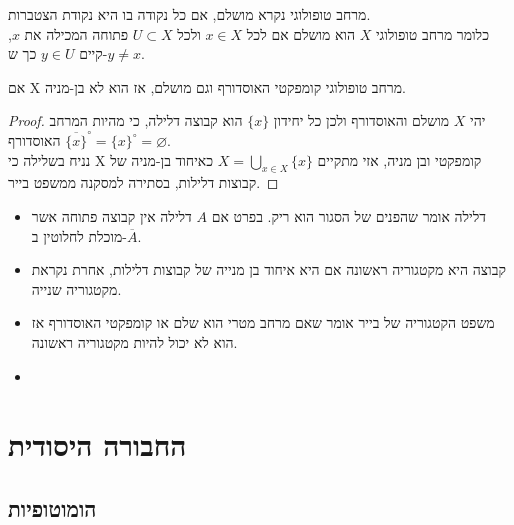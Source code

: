 \documentclass{tstextbook}
\begin{document}
\begin{definition}
מרחב טופולוגי נקרא מושלם, אם כל נקודה בו היא נקודת הצטברות.\\

כלומר מרחב טופולוגי \(X\) הוא מושלם אם לכל \(x\in X\) ולכל \(U\subset X\) פתוחה המכילה את \(x\), קיים \(y\in U\) כך ש-\(y\ne x\).  

\end{definition}
\begin{corollary}
אם X מרחב טופולוגי קומפקטי האוסדורף וגם מושלם, אז הוא לא בן-מניה.

\end{corollary}
\begin{proof}
יהי \(X\) מושלם והאוסדורף ולכן כל יחידון \(\{x\}\) הוא קבוצה דלילה, כי מהיות המרחב האוסדורף \(\overline{\{x\}}^{\circ}=\{x\}^{\circ}=\varnothing\).\\

נניח בשלילה כי X קומפקטי ובן מניה, אזי מתקיים \(X=\bigcup_{x\in X}\{x\}\) כאיחוד בן-מניה של קבוצות דלילות, בסתירה למסקנה ממשפט בייר.  

\end{proof}
\begin{summary}
  \begin{itemize}
    \item דלילה אומר שהפנים של הסגור הוא ריק. בפרט אם \(A\) דלילה אין קבוצה פתוחה אשר מוכלת לחלוטין ב-\(\overline{A}\).
    \item קבוצה היא מקטגוריה ראשונה אם היא איחוד בן מנייה של קבוצות דלילות, אחרת נקראת מקטגוריה שנייה.
    \item משפט הקטגוריה של בייר אומר שאם מרחב מטרי הוא שלם או קומפקטי האוסדורף אז הוא לא יכול להיות מקטגוריה ראשונה.
    \item 
  \end{itemize}
\end{summary}
\chapter{החבורה היסודית}

\section{הומוטופיות}
\end{document}
